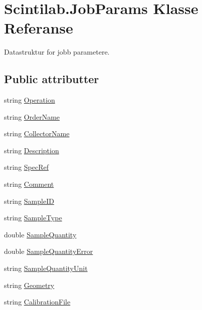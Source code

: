 \hypertarget{class_scintilab_1_1_job_params}{\section{Scintilab.\+Job\+Params Klasse Referanse}
\label{class_scintilab_1_1_job_params}
}


Datastruktur for jobb parametere.  


\subsection*{Public attributter}
\begin{DoxyCompactItemize}
\item 
string \hyperlink{class_scintilab_1_1_job_params_af7aa58322a6e62ae3cc3bd5d216d389b}{Operation}
\item 
string \hyperlink{class_scintilab_1_1_job_params_a191d91bcd772299d4a8db4e4f362356e}{Order\+Name}
\item 
string \hyperlink{class_scintilab_1_1_job_params_a50f5b190d5cb85fba96ab86ed2568084}{Collector\+Name}
\item 
string \hyperlink{class_scintilab_1_1_job_params_aebad6b202dfcdac00b50fcc16b182c06}{Description}
\item 
string \hyperlink{class_scintilab_1_1_job_params_ac1fe41f7d25ce43fe660d0d3400fc879}{Spec\+Ref}
\item 
string \hyperlink{class_scintilab_1_1_job_params_adf347061e6e1ef2aded345c8704dd364}{Comment}
\item 
string \hyperlink{class_scintilab_1_1_job_params_ad917381dddc28b41efe009a93a6cff75}{Sample\+I\+D}
\item 
string \hyperlink{class_scintilab_1_1_job_params_a92d7bef1d796fda654dd39c5d8e09bd0}{Sample\+Type}
\item 
double \hyperlink{class_scintilab_1_1_job_params_a22bf6144ff75386c53afa155261cc777}{Sample\+Quantity}
\item 
double \hyperlink{class_scintilab_1_1_job_params_ac3a995d441ec029ac47cd763e42b44c1}{Sample\+Quantity\+Error}
\item 
string \hyperlink{class_scintilab_1_1_job_params_a597f6b8466239ed6d4f3b490c48b7fc9}{Sample\+Quantity\+Unit}
\item 
string \hyperlink{class_scintilab_1_1_job_params_ae52cd6dc9a34a0738e7d40148e11ed45}{Geometry}
\item 
string \hyperlink{class_scintilab_1_1_job_params_a265274b89113071aaf8e397dd2bb71d5}{Calibration\+File}

\end{DoxyCompactItemize}

